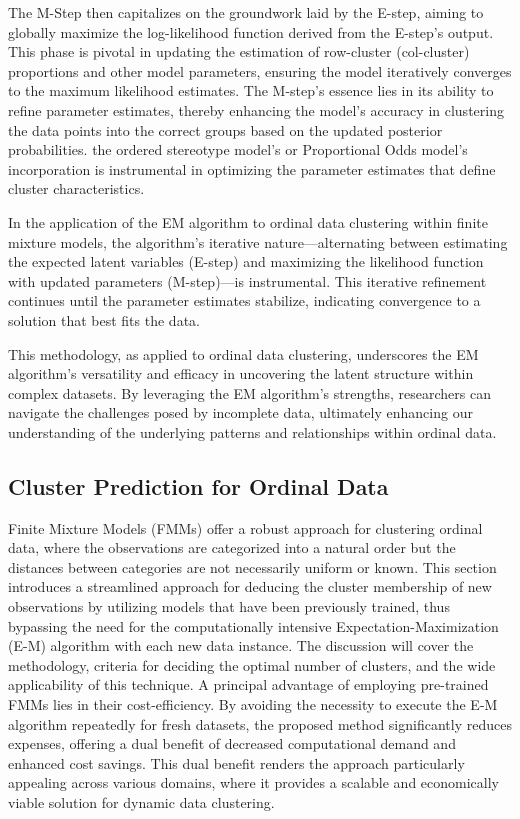 \documentclass{article}
\begin{document}
The M-Step then capitalizes on the groundwork laid by the E-step, aiming to globally maximize the log-likelihood function derived from the E-step's output. 
This phase is pivotal in updating the estimation of row-cluster (col-cluster) proportions and other model parameters, ensuring the model iteratively converges to the maximum likelihood estimates. 
The M-step's essence lies in its ability to refine parameter estimates, thereby enhancing the model's accuracy in clustering the data points into the correct groups based on the updated posterior probabilities.
the ordered stereotype model's or Proportional Odds model's incorporation is instrumental in optimizing the parameter estimates that define cluster characteristics. 

In the application of the EM algorithm to ordinal data clustering within finite mixture models, the algorithm's iterative nature—alternating between estimating the expected latent variables (E-step) and maximizing the likelihood function with updated parameters (M-step)—is instrumental. This iterative refinement continues until the parameter estimates stabilize, indicating convergence to a solution that best fits the data.

This methodology, as applied to ordinal data clustering, underscores the EM algorithm's versatility and efficacy in uncovering the latent structure within complex datasets. By leveraging the EM algorithm's strengths, researchers can navigate the challenges posed by incomplete data, ultimately enhancing our understanding of the underlying patterns and relationships within ordinal data.

\subsection{Cluster Prediction for Ordinal Data}

Finite Mixture Models (FMMs) offer a robust approach for clustering ordinal data, where the observations are categorized into a natural order but the distances between categories are not necessarily uniform or known. 
This section introduces a streamlined approach for deducing the cluster membership of new observations by utilizing models that have been previously trained, thus bypassing the need for the computationally intensive Expectation-Maximization (E-M) algorithm with each new data instance. 
The discussion will cover the methodology, criteria for deciding the optimal number of clusters, and the wide applicability of this technique. A principal advantage of employing pre-trained FMMs lies in their cost-efficiency. By avoiding the necessity to execute the E-M algorithm repeatedly for fresh datasets, the proposed method significantly reduces expenses, offering a dual benefit of decreased computational demand and enhanced cost savings. This dual benefit renders the approach particularly appealing across various domains, where it provides a scalable and economically viable solution for dynamic data clustering.
\end{document}
